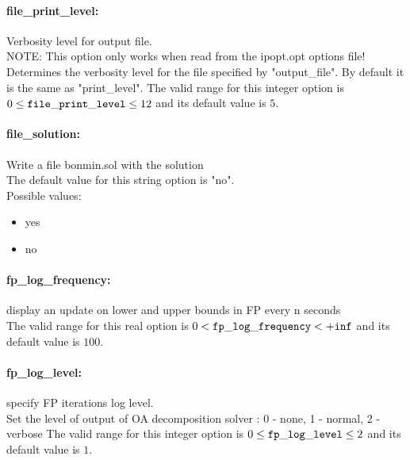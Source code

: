 \paragraph{file\_print\_level:}\label{opt:file_print_level} Verbosity level for output file. \\
 NOTE: This option only works when read from the ipopt.opt options file! Determines the verbosity level for the file specified by "output\_file".  By default it is the same as "print\_level". The valid range for this integer option is
$0 \le {\tt file\_print\_level } \le 12$
and its default value is $5$.


\paragraph{file\_solution:}\label{opt:file_solution} Write a file bonmin.sol with the solution \\
 The default value for this string option is "no".
\\ 
Possible values:
\begin{itemize}
   \item yes
   \item no
\end{itemize}

\paragraph{fp\_log\_frequency:}\label{opt:fp_log_frequency} display an update on lower and upper bounds in FP every n seconds \\
 The valid range for this real option is 
$0 <  {\tt fp\_log\_frequency } <  {\tt +inf}$
and its default value is $100$.


\paragraph{fp\_log\_level:}\label{opt:fp_log_level} specify FP iterations log level. \\
 Set the level of output of OA decomposition solver : 0 - none, 1 - normal, 2 - verbose The valid range for this integer option is
$0 \le {\tt fp\_log\_level } \le 2$
and its default value is $1$.


